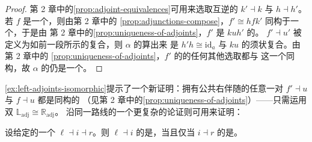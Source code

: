\begin{proof}
第 2 章中的\cref{prop:adjoint-equivalences}可用来选取互逆的\trAdjointEquivalence
$k'\dashv k$ 与 $h\dashv h'$。若 $f$ 是一个\trLeftAdjoint，则由第 2 章中的%
\cref{prop:adjunctions-compose}，$f'\cong hfk'$ 同构于一个\trLeftAdjoint，于是由
第 2 章中的\cref{prop:uniqueness-of-adjoints}，$f'$ 是 $kuh'$ 的\trLeftAdjoint。
$f'\dashv u'$ 被定义为如前一段所示的复合\trAdjunction，则 $\alpha$ 的\trMate{}算出来
是 $h'h\cong\mathrm{id}_{a}$ 与 $ku$ 的须状复合。由第 2 章中的%
\cref{prop:uniqueness-of-adjoints}，$f'$ 的\trRightAdjoint{}的任何其他选取都与
这一个同构，故 $\alpha$ 的\trMate{}仍是一个\trIsomorphism。
\end{proof}

\cref{ex:left-adjoints-isomorphic}提示了一个新证明：拥有公共右伴随的任意一对%
\trLeftAdjoint{} $f'\dashv u$ 与 $f\dashv u$ 都是同构的
（见第 2 章中的\cref{prop:uniqueness-of-adjoints}）——只需运用双%
\trIsomorphism{} $\mathbb{L}_{\mathrm{adj}}\cong\mathbb{R}_{\mathrm{adj}}$。
沿同一路线的一个更复杂的论证则可用来证明：

\begin{lemma}\label{lem:adjoint-triple-invertible-cells}
设给定\trFunctor{}的一个\trAdjointTriple{} $\ell\dashv i\dashv r$。则 $\ell\dashv i$
的\trCounit{}是\trInvertible，当且仅当 $i\dashv r$ 的\trUnit{}是\trInvertible。
\end{lemma}

